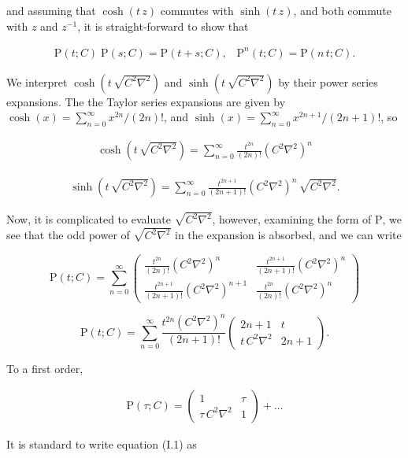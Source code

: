 \documentclass[amsmath,amssymb,floatfix]{revtex4}
\numberwithin{equation}{section}
\newcommand{\twomat}[4]{ \left( \begin{array}{cc} #1 & #2 \\ #3 & #4  \end{array} \right) }
\begin{document}
\noindent
and assuming that $\cosh{( t \, z )}$ commutes with $\sinh{( t \, z )}$, and both commute with $z$ and $z^{-1}$, it is straight-forward to show that 

\begin{eqnarray}
\textrm{P}(t; C) \; \textrm{P}(s; C) = \textrm{P}(t + s; C) ,  \; \; \;  \textrm{P}^n(t; C) = \textrm{P}(n \, t; C).
\end{eqnarray}

\noindent 
We interpret $\cosh{( t \, \sqrt{C^2\nabla^2} )}$ and $\sinh{( t \, \sqrt{C^2\nabla^2} )}$ by their power series expansions. The the Taylor series expansions are given by $\cosh{(x)} = \sum_{n=0}^\infty x^{2n}/(2 n)!$, and $\sinh{(x)} = \sum_{n=0}^\infty x^{2n+1}/(2 n+1)!$, so


\begin{eqnarray}
\cosh{( t \, \sqrt{C^2\nabla^2} )} =  \sum_{n=0}^\infty \frac{t^{2n}}{(2n)!} (C^2\nabla^2)^n
\end{eqnarray}

\begin{eqnarray}
\sinh{( t \, \sqrt{C^2\nabla^2} )} =  \sum_{n=0}^\infty \frac{t^{2n+1}}{(2n+1)!} (C^2\nabla^2)^n \, \sqrt{C^2\nabla^2}.
\end{eqnarray}

\noindent 
Now, it is complicated to evaluate $\sqrt{C^2\nabla^2}$, however, examining the form of $\textrm{P}$, we see that the odd power of $\sqrt{C^2\nabla^2}$ in the expansion is absorbed, and we can write



\begin{equation}
	 \textrm{P}(t; C) = \sum_{n=0}^\infty \twomat{\frac{t^{2n}}{(2n)!}(C^2\nabla^2)^n}{\frac{t^{2n+1}}{(2n+1)!}(C^2\nabla^2)^n}{\frac{t^{2n+1}}{(2n+1)!}(C^2\nabla^2)^{n+1}}{\frac{t^{2n}}{(2n)!}(C^2\nabla^2)^n}
\end{equation}
	 
\begin{equation}
	 \textrm{P}(t; C) = \sum_{n=0}^\infty \frac{t^{2n}(C^2\nabla^2)^n}{(2n+1)!}\twomat{2n+1}{t}{t \, C^2\nabla^2}{2n+1}.
\end{equation}

\noindent 
To a first order,

\begin{eqnarray}
	 \textrm{P}(\tau; C) = \twomat{1}{\tau}{\tau \, C^2\nabla^2}{1} +  ...
\end{eqnarray}

\noindent 
It is standard to write equation (I.1) as 
\end{document}
